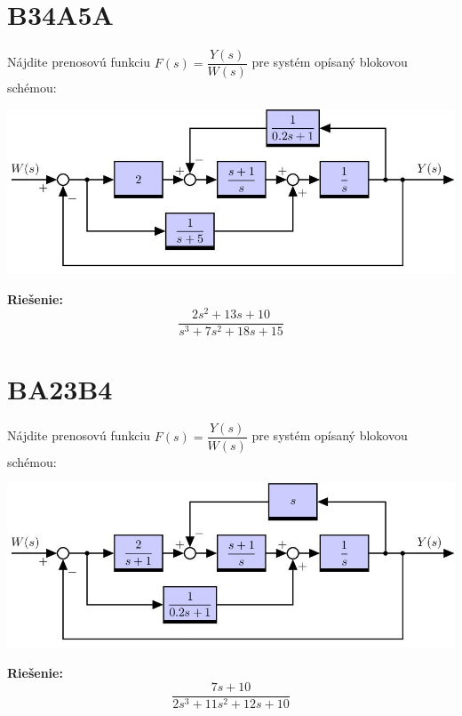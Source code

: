 \documentclass[a4paper, 12pt]{article}
\newenvironment{task}{}{}
\newenvironment{solution}{\noindent\textbf{Riešenie:}}{}
\begin{document}
\section*{B34A5A}
\begin{task}
    Nájdite prenosovú funkciu $F(s)=\dfrac{Y(s)}{W(s)}$ pre systém opísaný blokovou schémou: 

    \includegraphics{../assignments/images/blokovka01_00002.jpg} 
\end{task} 

\begin{solution}
    \begin{equation*}
        \dfrac{2s^2+13s+10}{s^3+7s^2+18s+15}
    \end{equation*}
\end{solution}

\section*{BA23B4}
\begin{task}
    Nájdite prenosovú funkciu $F(s)=\dfrac{Y(s)}{W(s)}$ pre systém opísaný blokovou schémou: 

    \includegraphics{../assignments/images/blokovka01_00003.jpg} 
\end{task} 

\begin{solution}
    \begin{equation*}
        \dfrac{7s+10}{2s^3+11s^2+12s+10}
    \end{equation*}
\end{solution}
\end{document}
